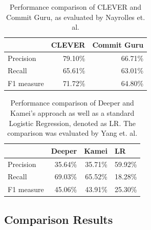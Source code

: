 \begin{table}[t]
	\centering
	\caption{Performance comparison of CLEVER and Commit Guru, as evaluated by Nayrolles et. al. \cite{Nayrolles2018}}
	\begin{tabular}{@{}lrr@{}}
		\toprule
		& \multicolumn{1}{l}{CLEVER} & \multicolumn{1}{l}{Commit Guru} \\ \midrule
		Precision  & 79.10\%                    & 66.71\%                         \\
		Recall     & 65.61\%                    & 63.01\%                         \\
		F1 measure & 71.72\%                    & 64.80\%                         \\ \bottomrule
	\end{tabular}
	\label{tab:perfclever}
\end{table}

\begin{table}[t]
	\centering
	\caption{Performance comparison of Deeper and Kamei's approach as well as a standard Logistic Regression, denoted as LR. The comparison was evaluated by Yang et. al. \cite{Yang2015}}
	\begin{tabular}{@{}lrrr@{}}
		\toprule
		& \multicolumn{1}{l}{Deeper} & \multicolumn{1}{l}{Kamei} & \multicolumn{1}{l}{LR} \\ \midrule
		Precision  & 35.64\%                    & 35.71\%                   & 59.92\%                \\
		Recall     & 69.03\%                    & 65.52\%                   & 18.28\%                \\
		F1 measure & 45.06\%                    & 43.91\%                   & 25.30\%                \\ \bottomrule
	\end{tabular}
	\label{tab:perfdeeper}
\end{table}



\subsection{Comparison Results}

